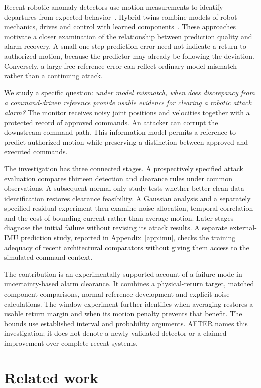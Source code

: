 \documentclass[11pt]{article}
\begin{document}
Recent robotic anomaly detectors use motion measurements to identify departures from expected behavior~\cite{casper,edge}. Hybrid twins combine models of robot mechanics, drives and control with learned components~\cite{hybrid}. These approaches motivate a closer examination of the relationship between prediction quality and alarm recovery. A small one-step prediction error need not indicate a return to authorized motion, because the predictor may already be following the deviation. Conversely, a large free-reference error can reflect ordinary model mismatch rather than a continuing attack.

We study a specific question: \emph{under model mismatch, when does discrepancy from a command-driven reference provide usable evidence for clearing a robotic attack alarm?} The monitor receives noisy joint positions and velocities together with a protected record of approved commands. An attacker can corrupt the downstream command path. This information model permits a reference to predict authorized motion while preserving a distinction between approved and executed commands.

The investigation has three connected stages. A prospectively specified attack evaluation compares thirteen detection and clearance rules under common observations. A subsequent normal-only study tests whether better clean-data identification restores clearance feasibility. A Gaussian analysis and a separately specified residual experiment then examine noise allocation, temporal correlation and the cost of bounding current rather than average motion. Later stages diagnose the initial failure without revising its attack results. A separate external-IMU prediction study, reported in Appendix~\ref{app:imu}, checks the training adequacy of recent architectural comparators without giving them access to the simulated command context.

The contribution is an experimentally supported account of a failure mode in uncertainty-based alarm clearance. It combines a physical-return target, matched component comparisons, normal-reference development and explicit noise calculations. The window experiment further identifies when averaging restores a usable return margin and when its motion penalty prevents that benefit. The bounds use established interval and probability arguments. AFTER names this investigation; it does not denote a newly validated detector or a claimed improvement over complete recent systems.

\section{Related work}
\end{document}
